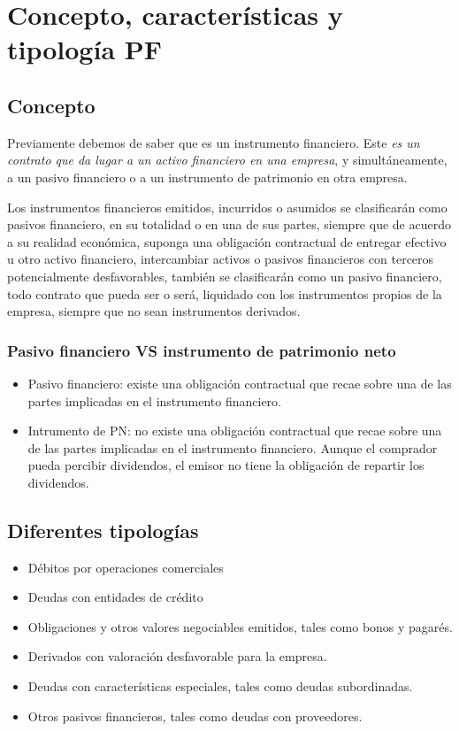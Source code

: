 \section{Concepto, características y tipología PF}

\subsection{Concepto}

Previamente debemos de saber que es un instrumento financiero. Este \textit{es un contrato que da lugar a un activo financiero en una empresa}, y simultáneamente, a un pasivo financiero o a un instrumento de patrimonio en otra empresa.

Los instrumentos financieros emitidos, incurridos o asumidos se clasificarán como pasivos financiero, en su totalidad o en una de sus partes, siempre que de acuerdo a su realidad económica, suponga una obligación contractual de entregar efectivo u otro activo financiero, intercambiar activos o pasivos financieros con terceros potencialmente desfavorables, también se clasificarán como un pasivo financiero, todo contrato que pueda ser o será, liquidado con los instrumentos propios de la empresa, siempre que no sean instrumentos derivados.

\subsubsection{Pasivo financiero VS instrumento de patrimonio neto}

\begin{itemize}
    \item Pasivo financiero: existe una obligación contractual que recae sobre una de las partes implicadas en el instrumento financiero. 
    \item Intrumento de PN: no existe una obligación contractual que recae sobre una de las partes implicadas en el instrumento financiero. Aunque el comprador pueda percibir dividendos, el emisor no tiene la obligación de repartir los dividendos.
\end{itemize}

\subsection{Diferentes tipologías}

\begin{itemize}
    \item Débitos por operaciones comerciales
    \item Deudas con entidades de crédito
    \item Obligaciones y otros valores negociables emitidos, tales como bonos y pagarés.
    \item Derivados con valoración desfavorable para la empresa.
    \item Deudas con características especiales, tales como deudas subordinadas.
    \item Otros pasivos financieros, tales como deudas con proveedores.
\end{itemize}

